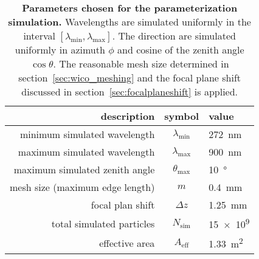 \begin{table}[H]
	\centering
	\begin{tabular}{r|c|l}
		\toprule
		description 				   & symbol               & value\\
		\midrule
		minimum simulated wavelength   & $\lambda_\text{min}$ & \SI{272}{\nano\meter}\\
		maximum simulated wavelength   & $\lambda_\text{max}$ & \SI{900}{\nano\meter}\\
		maximum simulated zenith angle & $\theta_\text{max}$  & \SI{10}{\degree}\\
		mesh size (maximum edge length)& $m$				  & \SI{0.4}{\milli\meter}\\
		focal plan shift 			   & $\Delta z$			  & \SI{1.25}{\milli\meter}\\
		total simulated particles      & $N_\text{sim}$		  & \num{15e9}\\
		effective area				   & $A_\text{eff}$		  & \SI{1.33}{\meter\squared}\\
		\bottomrule
	\end{tabular}
	\caption[Parameters chosen for the parameterization simulation]{\textbf{Parameters chosen for the parameterization simulation.} Wavelengths are simulated uniformly in the interval $[\lambda_\text{min}, \lambda_\text{max}]$. The direction are simulated uniformly in azimuth $\phi$ and cosine of the zenith angle $\cos{\theta}$. The reasonable mesh size determined in section~\ref{sec:wico_meshing} and the focal plane shift discussed in section~\ref{sec:focalplaneshift} is applied.}
	\label{paramsim:params}
\end{table}